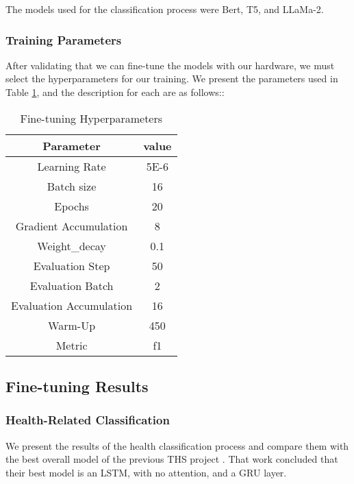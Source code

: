 The models used for the classification process were Bert, T5, and LLaMa-2. 


\subsubsection{Training Parameters}
After validating that we can fine-tune the models with our hardware, we must select the hyperparameters for our training. We present the parameters used in Table \ref{table:hyperparameters}, and the description for each are as follows::

\begin{table}[!ht]
	\centering
	\caption{Fine-tuning Hyperparameters}
	\begin{tabular}{||c | c||} 
		\hline
		\textbf{Parameter} & \textbf{value} \\ [1.5ex] 
		\hline
		Learning Rate & 5E-6  \\ [1ex]
		\hline
		Batch size & 16  \\[1ex]
		\hline
		Epochs & 20 \\[1ex]
		\hline
		Gradient Accumulation & 8 \\[1ex]
		\hline
		Weight\_decay & 0.1 \\[1ex]
		\hline
		Evaluation Step & 50 \\[1ex]
		\hline
		Evaluation Batch & 2 \\[1ex]
		\hline
		Evaluation Accumulation & 16 \\[1ex]
		\hline
		Warm-Up & 450 \\[1ex]
		\hline
		Metric & f1 \\[1ex]
		\hline
	\end{tabular}
	\label{table:hyperparameters}
\end{table}

\subsection{Fine-tuning Results}

\subsubsection{Health-Related Classification}
We present the results of the health classification process and compare them with the best overall model of the previous THS project \cite{8622504}. That work concluded
that their best model is an LSTM, with no attention, and a GRU layer.

